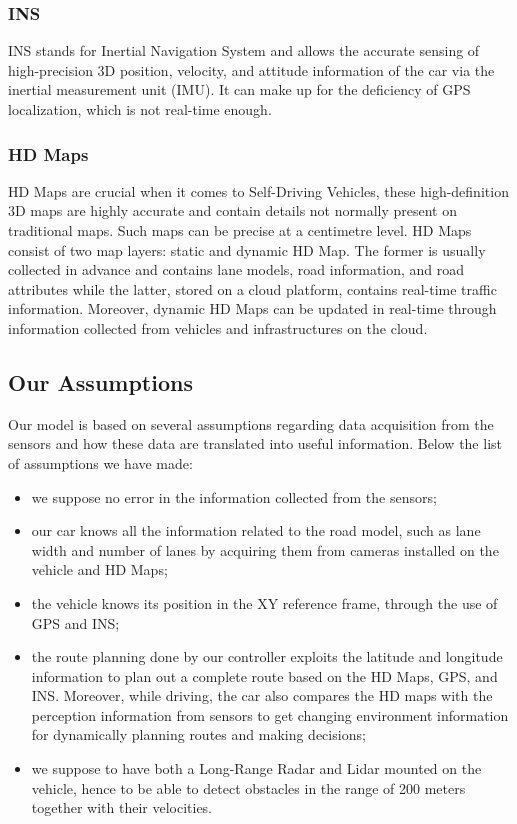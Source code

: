 \subsubsection{INS}
INS stands for Inertial Navigation System and allows the accurate sensing of high-precision 3D position, velocity, and attitude information of the car via the inertial measurement unit (IMU).
It can make up for the deficiency of GPS localization, which is not real-time enough.

\subsubsection{HD Maps}
HD Maps are crucial when it comes to Self-Driving Vehicles, these high-definition 3D maps are highly accurate and contain details not normally present on traditional maps. Such maps can be precise at a centimetre level.
HD Maps consist of two map layers: static and dynamic HD Map.
The former is usually collected in advance and contains lane models, road information, and road attributes while the latter, stored on a cloud platform, contains real-time traffic information. Moreover, dynamic HD Maps can be updated in real-time through information collected from vehicles and infrastructures on the cloud.

\subsection{Our Assumptions}

Our model is based on several assumptions regarding data acquisition from the sensors and how these data are translated into useful information. Below the list of assumptions we have made:
\begin{itemize}
    \item we suppose no error in the information collected from the sensors;
    \item our car knows all the information related to the road model, such as lane width and number of lanes by acquiring them from cameras installed on the vehicle and HD Maps;
    \item the vehicle knows its position in the XY reference frame, through the use of GPS and INS;
    \item the route planning done by our controller exploits the latitude and longitude information to plan out a complete route based on the HD Maps, GPS, and INS. Moreover, while driving, the car also compares the HD maps with the perception information from sensors to get changing environment information for dynamically planning routes and making decisions;
    \item we suppose to have both a Long-Range Radar and Lidar mounted on the vehicle, hence to be able to detect obstacles in the range of 200 meters together with their velocities.
\end{itemize}

